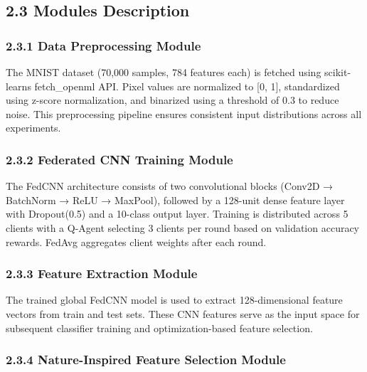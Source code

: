 \documentclass[
]{article}
\begin{document}
\hypertarget{modules-description}{%
\subsection{2.3 Modules Description}\label{modules-description}}

\hypertarget{data-preprocessing-module}{%
\subsubsection{2.3.1 Data Preprocessing
Module}\label{data-preprocessing-module}}

The MNIST dataset (70,000 samples, 784 features each) is fetched using
scikit-learn\textquotesingle s fetch\_openml API. Pixel values are
normalized to {[}0, 1{]}, standardized using z-score normalization, and
binarized using a threshold of 0.3 to reduce noise. This preprocessing
pipeline ensures consistent input distributions across all experiments.

\hypertarget{federated-cnn-training-module}{%
\subsubsection{2.3.2 Federated CNN Training
Module}\label{federated-cnn-training-module}}

The FedCNN architecture consists of two convolutional blocks (Conv2D →
BatchNorm → ReLU → MaxPool), followed by a 128-unit dense feature layer
with Dropout(0.5) and a 10-class output layer. Training is distributed
across 5 clients with a Q-Agent selecting 3 clients per round based on
validation accuracy rewards. FedAvg aggregates client weights after each
round.

\hypertarget{feature-extraction-module}{%
\subsubsection{2.3.3 Feature Extraction
Module}\label{feature-extraction-module}}

The trained global FedCNN model is used to extract 128-dimensional
feature vectors from train and test sets. These CNN features serve as
the input space for subsequent classifier training and
optimization-based feature selection.

\hypertarget{nature-inspired-feature-selection-module}{%
\subsubsection{2.3.4 Nature-Inspired Feature Selection
Module}\label{nature-inspired-feature-selection-module}}
\end{document}
